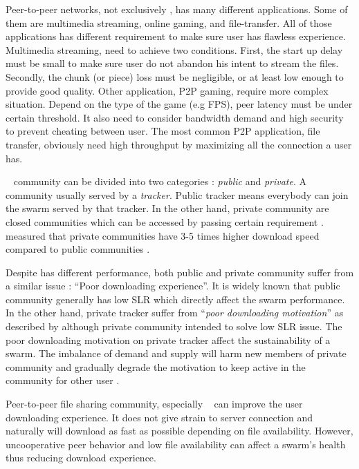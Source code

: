 Peer-to-peer networks, not exclusively \bt, has many different applications. Some of them are multimedia streaming, online gaming, and file-transfer. All of those applications has different requirement to make sure user has flawless experience. Multimedia streaming, need 
to achieve two conditions. First, the start up delay must be small to make sure user do not abandon his intent to stream the files. Secondly, the chunk (or piece) loss must be negligible, or at least low enough to provide good quality\cite{2008:givetogetvod:Mol}. Other application, P2P gaming, require more complex situation. Depend on the type of the game (e.g FPS), peer latency must be under certain threshold\cite{2010:surveyp2pgame:shen}. It also need to consider bandwidth demand and high security to prevent cheating between user. The most common P2P application, file transfer, obviously need high throughput by maximizing all the connection a user has.

\bt~ community can be divided into two categories : \textit{public} and \textit{private}. A community usually served by a \textit{tracker}. Public tracker means everybody can join the swarm served by that tracker. In the other hand, private community are closed communities which can be accessed by passing certain requirement \cite{2010:pubpriv:meulpolder, 2014:sustainabilitytorrent:chen}. \citeauthor{2010:pubpriv:meulpolder} measured that private communities have 3-5 times higher download speed compared to public communities \cite{2010:pubpriv:meulpolder}.

Despite has different performance, both public and private community suffer from a similar issue : ``Poor downloading experience''. It is widely known that public community generally has low SLR which directly affect the swarm performance. In the other hand, private tracker suffer from ``\textit{poor downloading motivation}'' as described by \citeauthor{2014:sustainabilitytorrent:chen}\cite{2014:sustainabilitytorrent:chen} although private community intended to solve low SLR issue. The poor downloading motivation on private tracker affect the sustainability of a swarm. The imbalance of demand and supply will harm new members of private community and gradually degrade the motivation to keep active in the community for other user \cite{2014:sustainabilitytorrent:chen}.

Peer-to-peer file sharing community, especially \bt~ can improve the user downloading experience. It does not give strain to server connection and naturally will download as fast as possible depending on file availability. However, uncooperative peer behavior and low file availability can affect a swarm's health thus reducing download experience.

